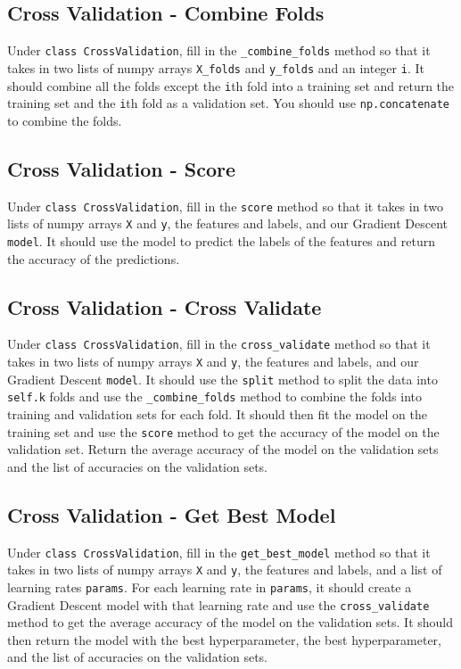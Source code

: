 \documentclass{article}
\begin{document}
\subsection{  Cross Validation - Combine Folds}
Under \verb|class CrossValidation|, fill in the \verb|_combine_folds| method so that it takes in two lists of numpy arrays \verb|X_folds| and \verb|y_folds| and an integer \verb|i|. It should combine all the folds except the \verb|i|th fold into a training set and return the training set and the \verb|i|th fold as a validation set. You should use \verb|np.concatenate| to combine the folds.

\subsection{  Cross Validation - Score}
Under \verb|class CrossValidation|, fill in the \verb|score| method so that it takes in two lists of numpy arrays \verb|X| and 
\verb|y|, the features and labels, and our Gradient Descent \verb|model|. It should use the model to predict the labels of the features and return the accuracy of the predictions.

\subsection{ Cross Validation - Cross Validate}

Under \verb|class CrossValidation|, fill in the \verb|cross_validate| method so that it takes in two lists of numpy arrays \verb|X| and \verb|y|, the features and labels, and our Gradient Descent \verb|model|. It should use the \verb|split| method to split the data into \verb|self.k| folds and use the \verb|_combine_folds| method to combine the folds into training and validation sets for each fold. It should then fit the model on the training set and use the \verb|score| method to get the accuracy of the model on the validation set. Return the average accuracy of the model on the validation sets and the list of accuracies on the validation sets.

\subsection{  Cross Validation - Get Best Model}
Under \verb|class CrossValidation|, fill in the \verb|get_best_model| method so that it takes in two lists of numpy arrays \verb|X| and \verb|y|, the features and labels, and a list of learning rates \verb|params|. For each learning rate in \verb|params|, it should create a Gradient Descent model with that learning rate and use the \verb|cross_validate| method to get the average accuracy of the model on the validation sets. It should then return the model with the best hyperparameter, the best hyperparameter, and the list of accuracies on the validation sets.
\end{document}
